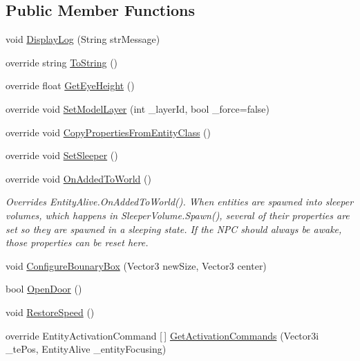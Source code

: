 \subsection*{Public Member Functions}
\begin{DoxyCompactItemize}
\item 
void \mbox{\hyperlink{class_entity_alive_s_d_x_a2454e38344f1472b1014c714ddb35363}{Display\+Log}} (String str\+Message)
\item 
override string \mbox{\hyperlink{class_entity_alive_s_d_x_a6805f64d706b8c0d6e9e64e9300287b8}{To\+String}} ()
\item 
override float \mbox{\hyperlink{class_entity_alive_s_d_x_a7bf3ec799d628a76677c72b5f9a6a6c3}{Get\+Eye\+Height}} ()
\item 
override void \mbox{\hyperlink{class_entity_alive_s_d_x_aa99e360e366e7cde612d14fd6ca5fcce}{Set\+Model\+Layer}} (int \+\_\+layer\+Id, bool \+\_\+force=false)
\item 
override void \mbox{\hyperlink{class_entity_alive_s_d_x_a07b192b0584e38a9e4bc8423ad2a0a7c}{Copy\+Properties\+From\+Entity\+Class}} ()
\item 
override void \mbox{\hyperlink{class_entity_alive_s_d_x_a4f22c141b55a541c94cbbd46176a021f}{Set\+Sleeper}} ()
\item 
override void \mbox{\hyperlink{class_entity_alive_s_d_x_ac76f63080e7882372bb47c3fc531112a}{On\+Added\+To\+World}} ()
\begin{DoxyCompactList}\small\item\em Overrides Entity\+Alive.\+On\+Added\+To\+World(). When entities are spawned into sleeper volumes, which happens in Sleeper\+Volume.\+Spawn(), several of their properties are set so they are spawned in a sleeping state. If the N\+PC should always be awake, those properties can be reset here. \end{DoxyCompactList}\item 
void \mbox{\hyperlink{class_entity_alive_s_d_x_a6daeef683d8ae8742fcf499bff7d8423}{Configure\+Bounary\+Box}} (Vector3 new\+Size, Vector3 center)
\item 
bool \mbox{\hyperlink{class_entity_alive_s_d_x_ae3cc6fc675963b2d57503f041992e6cc}{Open\+Door}} ()
\item 
void \mbox{\hyperlink{class_entity_alive_s_d_x_a811e2987752f0e9dbdf8a346f34fabaf}{Restore\+Speed}} ()
\item 
override Entity\+Activation\+Command \mbox{[}$\,$\mbox{]} \mbox{\hyperlink{class_entity_alive_s_d_x_a824f26d15c794d3935249af12e135de9}{Get\+Activation\+Commands}} (Vector3i \+\_\+te\+Pos, Entity\+Alive \+\_\+entity\+Focusing)

\end{DoxyCompactItemize}
